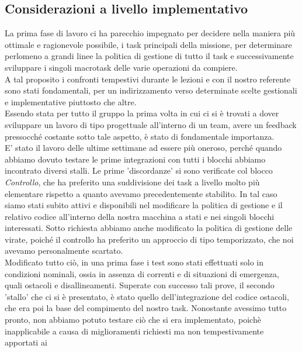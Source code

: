 \documentclass{article}
\begin{document}
        \subsection{Considerazioni a livello implementativo}
            La prima fase di lavoro ci ha parecchio impegnato per decidere nella maniera più ottimale e ragionevole possibile,
            i task principali della missione, per determinare perlomeno a grandi linee la politica di gestione di tutto il task e successivamente sviluppare i singoli
            macrotask delle varie operazioni da compiere.\\ 
            A tal proposito i confronti tempestivi durante le lezioni e con il nostro referente sono stati fondamentali, per un 
            indirizzamento verso determinate scelte gestionali e implementative piuttosto che altre.\\
            Essendo stata per tutto il gruppo la prima volta in cui ci si è 
            trovati a dover sviluppare un lavoro di tipo progettuale all'interno di un team, avere un feedback pressocché costante sotto tale aspetto, 
            è stato di fondamentale importanza.\\
            E' stato il lavoro delle ultime settimane ad essere più oneroso, perché quando abbiamo dovuto testare le prime integrazioni con tutti i blocchi abbiamo incontrato 
            diversi stalli. Le prime 'discordanze' si sono verificate col blocco \textit{Controllo}, che ha preferito una suddivisione dei task a livello molto più elementare
            rispetto a quanto avevamo precedentemente stabilito. In tal 
            caso siamo stati subito attivi e disponibili nel modificare la politica di gestione e il relativo codice all'interno della nostra macchina a stati e nei singoli blocchi
            interessati. Sotto richiesta abbiamo anche modificato la politica di gestione delle virate, poiché il controllo ha preferito un approccio di tipo temporizzato,
            che noi avevamo personalmente scartato.\\
            Modificato tutto ciò, in una prima fase i test sono stati effettuati solo in condizioni nominali, ossia in assenza di correnti e di situazioni di emergenza, quali
            ostacoli e disallineamenti.
            Superate con successo tali prove, il secondo 'stallo' che ci si è presentato, è stato quello dell'integrazione del codice ostacoli, che era poi la base del compimento
            del nostro task. Nonostante 
            avessimo tutto pronto, non abbiamo potuto testare ciò che si era implementato, poichè inapplicabile a causa di miglioramenti richiesti ma non tempestivamente apportati ai
\end{document}
